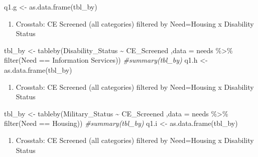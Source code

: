 \documentclass[
]{article}
\newenvironment{Shaded}{\begin{snugshade}}{\end{snugshade}}
\newcommand{\AttributeTok}[1]{\textcolor[rgb]{0.77,0.63,0.00}{#1}}
\newcommand{\CommentTok}[1]{\textcolor[rgb]{0.56,0.35,0.01}{\textit{#1}}}
\newcommand{\FunctionTok}[1]{\textcolor[rgb]{0.00,0.00,0.00}{#1}}
\newcommand{\NormalTok}[1]{#1}
\newcommand{\OtherTok}[1]{\textcolor[rgb]{0.56,0.35,0.01}{#1}}
\newcommand{\SpecialCharTok}[1]{\textcolor[rgb]{0.00,0.00,0.00}{#1}}
\newcommand{\StringTok}[1]{\textcolor[rgb]{0.31,0.60,0.02}{#1}}
\providecommand{\tightlist}{%
  \setlength{\itemsep}{0pt}\setlength{\parskip}{0pt}}
\begin{document}
\begin{Shaded}
\begin{Highlighting}[]
\NormalTok{q1.g }\OtherTok{\textless{}{-}} \FunctionTok{as.data.frame}\NormalTok{(tbl\_by)}
\end{Highlighting}
\end{Shaded}

\begin{enumerate}
\def\labelenumi{\alph{enumi}.}
\setcounter{enumi}{7}
\tightlist
\item
  Crosstab: CE Screened (all categories) filtered by Need=Housing x
  Disability Status
\end{enumerate}

\begin{Shaded}
\begin{Highlighting}[]
\NormalTok{tbl\_by }\OtherTok{\textless{}{-}} \FunctionTok{tableby}\NormalTok{(Disability\_Status }\SpecialCharTok{\textasciitilde{}}\NormalTok{ CE\_Screened ,}\AttributeTok{data =}\NormalTok{ needs }\SpecialCharTok{\%\textgreater{}\%} \FunctionTok{filter}\NormalTok{(Need }\SpecialCharTok{==} \StringTok{\textquotesingle{}Information Services\textquotesingle{}}\NormalTok{))}
\CommentTok{\#summary(tbl\_by)}
\NormalTok{q1.h }\OtherTok{\textless{}{-}} \FunctionTok{as.data.frame}\NormalTok{(tbl\_by)}
\end{Highlighting}
\end{Shaded}

\begin{enumerate}
\def\labelenumi{\roman{enumi}.}
\tightlist
\item
  Crosstab: CE Screened (all categories) filtered by Need=Housing x
  Disability Status
\end{enumerate}

\begin{Shaded}
\begin{Highlighting}[]
\NormalTok{tbl\_by }\OtherTok{\textless{}{-}} \FunctionTok{tableby}\NormalTok{(Military\_Status }\SpecialCharTok{\textasciitilde{}}\NormalTok{ CE\_Screened ,}\AttributeTok{data =}\NormalTok{ needs }\SpecialCharTok{\%\textgreater{}\%} \FunctionTok{filter}\NormalTok{(Need }\SpecialCharTok{==} \StringTok{\textquotesingle{}Housing\textquotesingle{}}\NormalTok{))}
\CommentTok{\#summary(tbl\_by)}
\NormalTok{q1.i }\OtherTok{\textless{}{-}} \FunctionTok{as.data.frame}\NormalTok{(tbl\_by)}
\end{Highlighting}
\end{Shaded}

\begin{enumerate}
\def\labelenumi{\alph{enumi}.}
\setcounter{enumi}{9}
\tightlist
\item
  Crosstab: CE Screened (all categories) filtered by Need=Housing x
  Disability Status
\end{enumerate}
\end{document}
